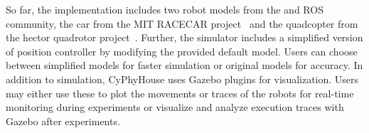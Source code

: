 So far, the implementation includes two \Gazebo robot models from the \Gazebo and ROS community,
the car from the MIT RACECAR project~\cite{MIT_RACECAR} and the quadcopter from the hector quadrotor project~\cite{hector_quadrotor}.
Further, the simulator includes a simplified version of position controller by modifying the provided default model. Users can choose between simplified models for faster simulation or original models for accuracy. In addition to simulation, CyPhyHouse uses Gazebo plugins for visualization. Users may either use these to plot the movements or traces of the robots for real-time monitoring during experiments or visualize and analyze execution traces with Gazebo after experiments.


